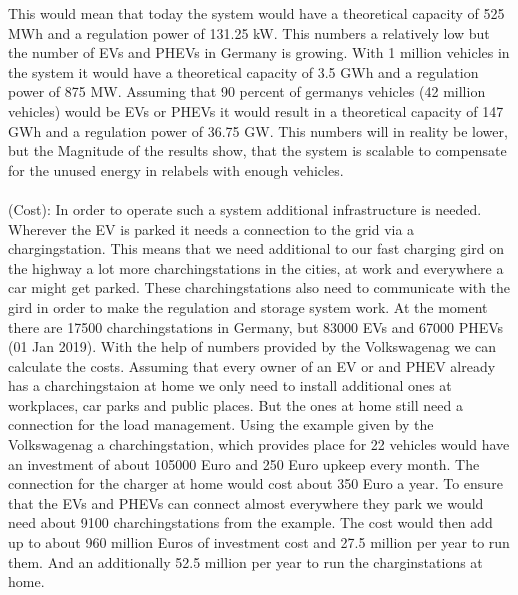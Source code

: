 \documentclass[12pt,a4paper]{article}
\begin{document}
\begin{parcolumns}[colwidths={1=2.5 cm, 2=10 cm, 3=2.5cm}]{3}
{%
This would mean that today the system would have a theoretical capacity of 525 MWh and a regulation power of 131.25 kW. This numbers a relatively low but the number of EVs and PHEVs in Germany is growing. With 1 million vehicles in the system it would have a theoretical capacity of 3.5 GWh and a regulation power of 875 MW. Assuming that 90 percent of germanys vehicles (42 million vehicles) would be EVs or PHEVs it would result in a theoretical capacity of 147 GWh and a regulation power of 36.75 GW. This numbers will in reality be lower, but the Magnitude of the results show, that the system is scalable to compensate for the unused energy in relabels with enough vehicles.
\\ \\
\noindent
(Cost): In order to operate such a system additional infrastructure is needed. Wherever the EV is parked it needs a connection to the grid via a chargingstation. This means that we need additional to our fast charging gird on the highway a lot more charchingstations in the cities, at work and everywhere a car might get parked. These charchingstations also need to communicate with the gird in order to make the regulation and storage system work.
At the moment there are 17500 charchingstations in Germany, but 83000 EVs and 67000 PHEVs (01 Jan 2019).
With the help of numbers provided by the Volkswagenag we can calculate the costs. Assuming that every owner of an EV or and PHEV already has a charchingstaion at home we only need to install additional ones at workplaces, car parks and public places. But the ones at home still need a connection for the load management. Using the example given by the Volkswagenag a charchingstation, which provides place for 22 vehicles would have an investment of about 105000 Euro and 250 Euro upkeep every month. The connection for the charger at home would cost about 350 Euro a year.
To ensure that the EVs and PHEVs can connect almost everywhere they park we would need about 9100 charchingstations from the example.
The cost would then add up to about 960 million Euros of investment cost and 27.5 million per year to run them. And an additionally 52.5 million per year to run the charginstations at home.
}
\end{parcolumns}
\end{document}

